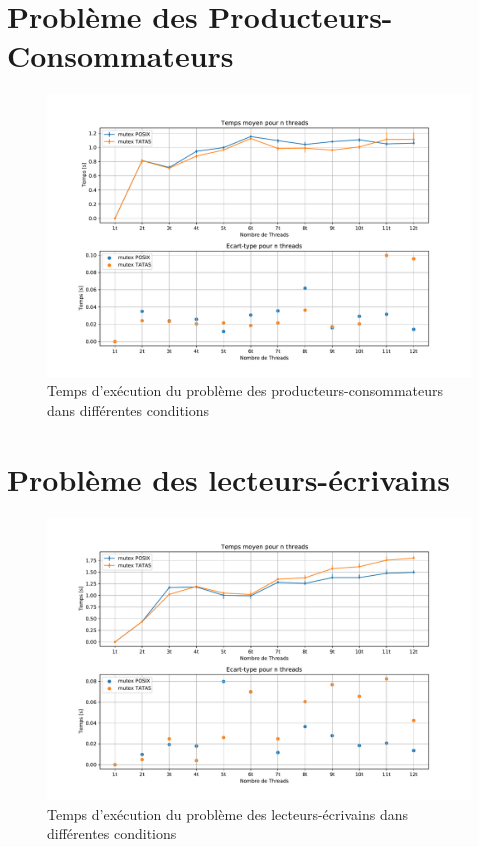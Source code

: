 \section{Problème des Producteurs-Consommateurs}


\begin{figure}[h!]
    \centering
    \includegraphics[scale=0.5]{img/prodcons.pdf}
    \caption{Temps d'exécution du problème des producteurs-consommateurs dans différentes conditions}
    \label{pic:prodcons}
\end{figure}


\section{Problème des lecteurs-écrivains}

\begin{figure}[h!]
    \centering
    \includegraphics[scale=0.5]{img/readwrt.pdf}
    \caption{Temps d'exécution du problème des lecteurs-écrivains dans différentes conditions}
    \label{pic:readwrt}
\end{figure}

